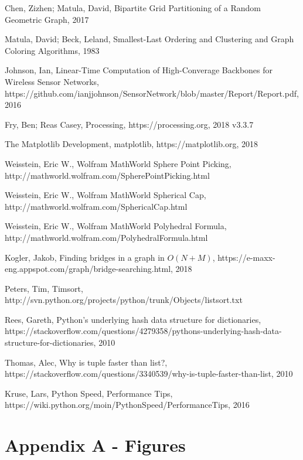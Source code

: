 \documentclass{article}
\begin{document}
\begin{thebibliography}{13}
    Chen, Zizhen; Matula, David, Bipartite Grid Partitioning of a Random Geometric Graph, 2017

    Matula, David; Beck, Leland, Smallest-Last Ordering and Clustering and Graph Coloring Algorithms, 1983

    Johnson, Ian, Linear-Time Computation of High-Converage Backbones for Wireless Sensor Networks, https://github.com/ianjjohnson/SensorNetwork/blob/master/Report/Report.pdf, 2016

    Fry, Ben; Reas Casey, Processing, https://processing.org, 2018 v3.3.7

    The Matplotlib Development, matplotlib, https://matplotlib.org, 2018

    Weisstein, Eric W., Wolfram MathWorld Sphere Point Picking, http://mathworld.wolfram.com/SpherePointPicking.html

    Weisstein, Eric W., Wolfram MathWorld Spherical Cap, http://mathworld.wolfram.com/SphericalCap.html

    Weisstein, Eric W., Wolfram MathWorld Polyhedral Formula, http://mathworld.wolfram.com/PolyhedralFormula.html

    Kogler, Jakob, Finding bridges in a graph in $O(N + M)$, https://e-maxx-eng.appspot.com/graph/bridge-searching.html, 2018

    Peters, Tim, Timsort, http://svn.python.org/projects/python/trunk/Objects/listsort.txt

    Rees, Gareth, Python's underlying hash data structure for dictionaries, https://stackoverflow.com/questions/4279358/pythons-underlying-hash-data-structure-for-dictionaries, 2010

    Thomas, Alec, Why is tuple faster than list?, https://stackoverflow.com/questions/3340539/why-is-tuple-faster-than-list, 2010

    Kruse, Lars, Python Speed, Performance Tips, https://wiki.python.org/moin/PythonSpeed/PerformanceTips, 2016

\end{thebibliography}

\newpage

\section{Appendix A - Figures}
\end{document}
